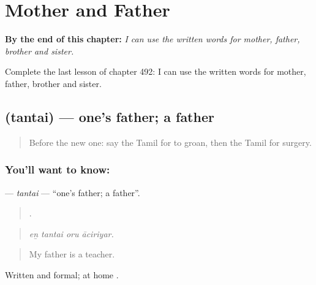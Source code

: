 
\chapter{Mother and Father}
\label{ch:ta-mother-and-father}

\begin{chapteropening}
\textbf{By the end of this chapter:} \emph{I can use the written words for mother, father, brother and sister.}

Complete the last lesson of chapter 492: I can use the written words for mother, father, brother and sister.
\end{chapteropening}

\section[\texorpdfstring{\ta{தந்தை} (tantai)}{தந்தை (tantai)}]{ (tantai) — one’s father; a father}

\label{lesson:TA-C492-tantai}



\begin{quote}
Before the new one: say the Tamil for to groan, then the Tamil for surgery.
\end{quote}

\subsection*{You'll want to know: }
\textbf{} — \emph{tantai} — \textquotedblleft{}one’s father; a father\textquotedblright{}.

\begin{quote}
   .
\end{quote}

\begin{quote}
\emph{eṉ tantai oru āciriyar.}
\end{quote}

\begin{quote}
My father is a teacher.
\end{quote}

Written and formal; at home .

